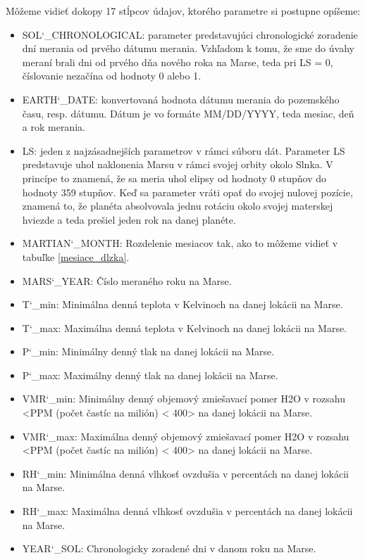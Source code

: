 Môžeme vidieť dokopy 17 stĺpcov údajov, ktorého parametre si postupne opíšeme:
\begin{itemize}
    \item SOL\char`_CHRONOLOGICAL: parameter predstavujúci chronologické zoradenie dní merania od prvého dátumu merania. Vzhľadom k tomu, že sme do úvahy meraní brali dni od prvého dňa nového roka na Marse, teda pri LS = 0, číslovanie nezačína od hodnoty 0 alebo 1. 
    \item EARTH\char`_DATE: konvertovaná hodnota dátumu merania do pozemského času, resp. dátumu. Dátum je vo formáte MM/DD/YYYY, teda mesiac, deň a rok merania.
    \item LS: jeden z najzásadnejších parametrov v rámci súboru dát. Parameter LS predstavuje uhol naklonenia Marsu v rámci svojej orbity okolo Slnka. V princípe to znamená, že sa meria uhol elipsy od hodnoty 0 stupňov do hodnoty 359 stupňov. Keď sa parameter vráti opať do svojej nulovej pozície, znamená to, že planéta absolvovala jednu rotáciu okolo svojej materskej hviezde a teda prešiel jeden rok na danej planéte. 
    \item MARTIAN\char`_MONTH: Rozdelenie mesiacov tak, ako to môžeme vidieť v tabuľke \ref{mesiace_dlzka}.
    \item MARS\char`_YEAR: Číslo meraného roku na Marse.
    \item T\char`_min: Minimálna denná teplota v Kelvinoch na danej lokácii na Marse.
    \item T\char`_max: Maximálna denná teplota v Kelvinoch na danej lokácii na Marse.
    \item P\char`_min: Minimálny denný tlak na danej lokácii na Marse.
    \item P\char`_max: Maximálny denný tlak na danej lokácii na Marse.
    \item VMR\char`_min: Minimálny denný objemový zmiešavací pomer H2O v rozsahu <PPM (počet častíc na milión) < 400> na danej lokácii na Marse. 
    \item VMR\char`_max: Maximálna denný objemový zmiešavací pomer H2O v rozsahu <PPM (počet častíc na milión) < 400> na danej lokácii na Marse. 
    \item RH\char`_min: Minimálna denná vlhkosť ovzdušia v percentách na danej lokácii na Marse.
    \item RH\char`_max: Maximálna denná vlhkosť ovzdušia v percentách na danej lokácii na Marse.
    \item YEAR\char`_SOL: Chronologicky zoradené dni v danom roku na Marse.
\end{itemize}

